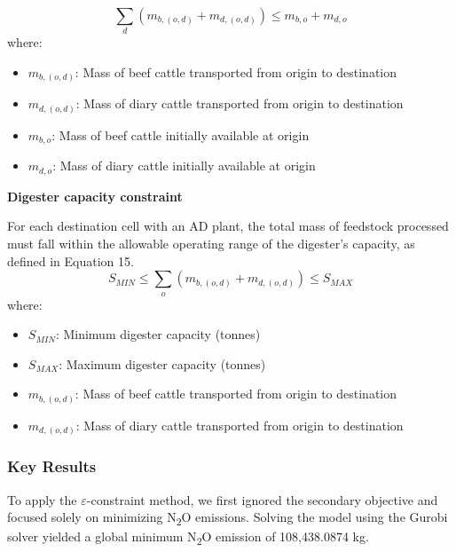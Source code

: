 \documentclass[12pt]{article}
\begin{document}
\begin{equation}
  \sum_d (m_{b, (o, d)} + m_{d, (o, d)}) \leq m_{b,o} + m_{d,o}
\end{equation}
where:
\begin{itemize}
  \item $m_{b, (o, d)}$: Mass of beef cattle transported from origin to destination
  \item $m_{d, (o, d)}$: Mass of diary cattle transported from origin to destination
  \item $m_{b,o}$: Mass of beef cattle initially available at origin
  \item $m_{d,o}$: Mass of diary cattle initially available at origin
\end{itemize}

\vspace{10pt}
\textbf{Digester capacity constraint}

For each destination cell with an AD plant, the total mass of feedstock processed must fall within the allowable operating range of the digester’s capacity, as defined in Equation 15.
\begin{equation}
  S_{MIN} \leq \sum_o (m_{b, (o, d)} + m_{d, (o, d)}) \leq S_{MAX}
\end{equation}
where:
\begin{itemize}
  \item $S_{MIN}$: Minimum digester capacity (tonnes)
  \item $S_{MAX}$: Maximum digester capacity (tonnes)
  \item $m_{b, (o, d)}$: Mass of beef cattle transported from origin to destination
  \item $m_{d, (o, d)}$: Mass of diary cattle transported from origin to destination
\end{itemize}

\subsubsection{Key Results}

To apply the $\varepsilon$-constraint method, we first ignored the secondary objective and focused solely on minimizing N\textsubscript{2}O emissions. Solving the model using the Gurobi solver yielded a global minimum N\textsubscript{2}O emission of 108,438.0874 kg.
\end{document}
